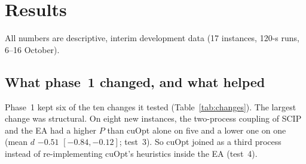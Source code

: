 \section{Results}\label{sec:results}
All numbers are descriptive, interim development data (17 instances, 120-s runs, 6--16 October).

\subsection{What phase~1 changed, and what helped}\label{sec:res-dev}
Phase~1 kept six of the ten changes it tested (Table~\ref{tab:changes}). The largest change was structural. On eight
new instances, the two-process coupling of SCIP and the EA had a higher $P$ than cuOpt alone on five and a lower one
on one (mean $d$ $-0.51$ $[-0.84, -0.12]$; test~3). So cuOpt joined as a third process instead of re-implementing
cuOpt's heuristics inside the EA (test~4).

